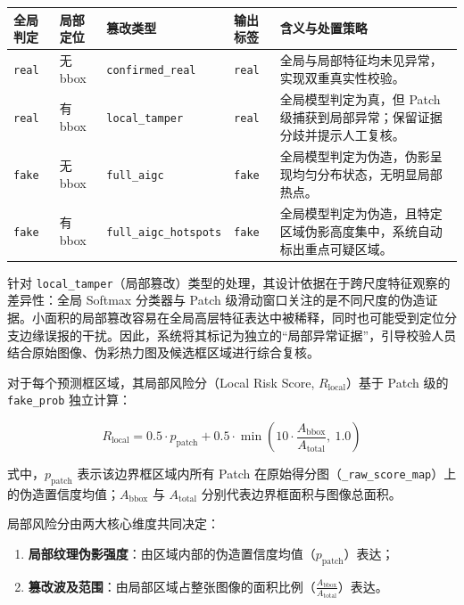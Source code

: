 \documentclass[UTF8, a4paper, 12pt]{ctexart}
\begin{document}
\begin{table}[htbp]
\centering
\caption{四象限局部篡改分类与证据类型映射表}
\label{tab:four_quadrant_classification}
\begin{longtable}{@{}P{1.2cm}P{1.5cm}P{3.8cm}P{1.2cm}P{6.5cm}@{}}
\toprule
\textbf{全局判定} & \textbf{局部定位} & \textbf{篡改类型} & \textbf{输出标签} & \textbf{含义与处置策略} \\
\midrule
\endhead
\texttt{real} & 无 bbox & \texttt{confirmed\_real} & \texttt{real} & 全局与局部特征均未见异常，实现双重真实性校验。 \\
\noalign{\smallskip}
\texttt{real} & 有 bbox & \texttt{local\_tamper} & \texttt{real} & 全局模型判定为真，但 Patch 级捕获到局部异常；保留证据分歧并提示人工复核。 \\
\noalign{\smallskip}
\texttt{fake} & 无 bbox & \texttt{full\_aigc} & \texttt{fake} & 全局模型判定为伪造，伪影呈现均匀分布状态，无明显局部热点。 \\
\noalign{\smallskip}
\texttt{fake} & 有 bbox & \texttt{full\_aigc\_hotspots} & \texttt{fake} & 全局模型判定为伪造，且特定区域伪影高度集中，系统自动标出重点可疑区域。 \\
\bottomrule
\end{longtable}
\end{table}

针对 \texttt{local\_tamper}（局部篡改）类型的处理，其设计依据在于跨尺度特征观察的差异性：全局 Softmax 分类器与 Patch 级滑动窗口关注的是不同尺度的伪造证据。小面积的局部篡改容易在全局高层特征表达中被稀释，同时也可能受到定位分支边缘误报的干扰。因此，系统将其标记为独立的“局部异常证据”，引导校验人员结合原始图像、伪彩热力图及候选框区域进行综合复核。

对于每个预测框区域，其局部风险分（Local Risk Score, $R_{\text{local}}$）基于 Patch 级的 \texttt{fake\_prob} 独立计算：

\begin{equation}
R_{\text{local}} = 0.5 \cdot p_{\text{patch}} + 0.5 \cdot \min\left(10 \cdot \frac{A_{\text{bbox}}}{A_{\text{total}}},\ 1.0\right)
\end{equation}

式中，$p_{\text{patch}}$ 表示该边界框区域内所有 Patch 在原始得分图（\texttt{\_raw\_score\_map}）上的伪造置信度均值；$A_{\text{bbox}}$ 与 $A_{\text{total}}$ 分别代表边界框面积与图像总面积。

局部风险分由两大核心维度共同决定：
\begin{enumerate}
 \item \textbf{局部纹理伪影强度}：由区域内部的伪造置信度均值（$p_{\text{patch}}$）表达；
 \item \textbf{篡改波及范围}：由局部区域占整张图像的面积比例（$\frac{A_{\text{bbox}}}{A_{\text{total}}}$）表达。
\end{enumerate}
\end{document}
